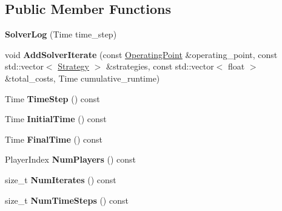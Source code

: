\subsection*{Public Member Functions}
\begin{DoxyCompactItemize}
\item 
{\bfseries Solver\+Log} (Time time\+\_\+step)\hypertarget{classilqgames_1_1_solver_log_a7cc54ade816d9ab9d8e794f72a8aee64}{}\label{classilqgames_1_1_solver_log_a7cc54ade816d9ab9d8e794f72a8aee64}

\item 
void {\bfseries Add\+Solver\+Iterate} (const \hyperlink{structilqgames_1_1_operating_point}{Operating\+Point} \&operating\+\_\+point, const std\+::vector$<$ \hyperlink{structilqgames_1_1_strategy}{Strategy} $>$ \&strategies, const std\+::vector$<$ float $>$ \&total\+\_\+costs, Time cumulative\+\_\+runtime)\hypertarget{classilqgames_1_1_solver_log_a51b9389f1eb32a9f3e4f7ed271bd0a81}{}\label{classilqgames_1_1_solver_log_a51b9389f1eb32a9f3e4f7ed271bd0a81}

\item 
Time {\bfseries Time\+Step} () const \hypertarget{classilqgames_1_1_solver_log_a133c4f7326bc17d88dac054988a8ba2c}{}\label{classilqgames_1_1_solver_log_a133c4f7326bc17d88dac054988a8ba2c}

\item 
Time {\bfseries Initial\+Time} () const \hypertarget{classilqgames_1_1_solver_log_aaaf83583b07bc9b9974ff0a21b11129b}{}\label{classilqgames_1_1_solver_log_aaaf83583b07bc9b9974ff0a21b11129b}

\item 
Time {\bfseries Final\+Time} () const \hypertarget{classilqgames_1_1_solver_log_a7d4f0d183aaa7f5a0a0818a301f4994f}{}\label{classilqgames_1_1_solver_log_a7d4f0d183aaa7f5a0a0818a301f4994f}

\item 
Player\+Index {\bfseries Num\+Players} () const \hypertarget{classilqgames_1_1_solver_log_af2b335909e75f63a910f4f734890d4d7}{}\label{classilqgames_1_1_solver_log_af2b335909e75f63a910f4f734890d4d7}

\item 
size\+\_\+t {\bfseries Num\+Iterates} () const \hypertarget{classilqgames_1_1_solver_log_a205590ee3aadd88aaf11ef6b5bb774dc}{}\label{classilqgames_1_1_solver_log_a205590ee3aadd88aaf11ef6b5bb774dc}

\item 
size\+\_\+t {\bfseries Num\+Time\+Steps} () const \hypertarget{classilqgames_1_1_solver_log_a21898bab7582fcf5ca77fe336479b07b}{}\label{classilqgames_1_1_solver_log_a21898bab7582fcf5ca77fe336479b07b}


\end{DoxyCompactItemize}
